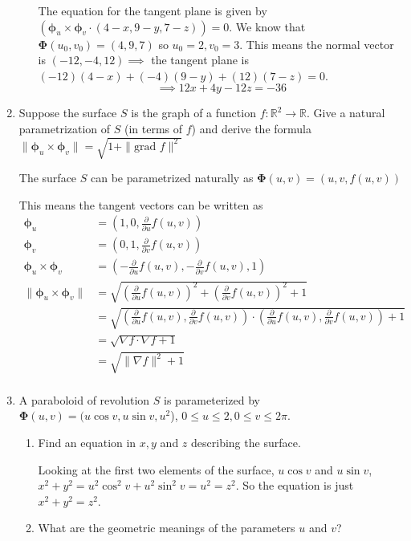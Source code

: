\documentclass{article}
\newcommand{\norm}[1]{\| #1 \|}
\begin{document}
\begin{enumerate}
\begin{enumerate}
        The equation for the tangent plane is given by $(\boldsymbol \phi_u \times \boldsymbol \phi_v \cdot (4-x,9-y,7-z)) = 0$. We know that $\boldsymbol \Phi (u_0, v_0) = (4,9,7)$ so $u_0 = 2, v_0 = 3$. This means the normal vector is $(-12,-4,12) \implies$ the tangent plane is $(-12)(4-x) + (-4)(9-y) + (12)(7-z) = 0$.
        \[ \implies 12x + 4y - 12z = -36 \]
    \end{enumerate}
    \newpage    
    \item Suppose the surface $S$ is the graph of a function $f : \mathbb{R}^2 \rightarrow \mathbb{R}$. Give a natural parametrization of $S$ (in terms of $f$) and derive the formula $\norm{\boldsymbol \phi_u \times \boldsymbol \phi_v} = \sqrt{1 + \norm{\text{grad }f}^2}$

    The surface $S$ can be parametrized naturally as $\boldsymbol \Phi (u,v) = (u, v, f(u,v))$

    This means the tangent vectors can be written as
    \begin{align*}
        \boldsymbol \phi_u &= (1, 0, \frac{\partial}{\partial u} f(u,v)) \\
        \boldsymbol \phi_v &= (0, 1, \frac{\partial}{\partial v} f(u,v)) \\
        \boldsymbol \phi_u \times \boldsymbol \phi_v &= ( - \frac{\partial}{\partial u} f(u,v),  - \frac{\partial}{\partial v} f(u,v), 1) \\
        \norm{\boldsymbol \phi_u \times \boldsymbol \phi_v} &= \sqrt{(\frac{\partial}{\partial u} f(u,v))^2 + (\frac{\partial}{\partial v} f(u,v))^2 + 1} \\
        &= \sqrt{ (\frac{\partial}{\partial u} f(u,v), \frac{\partial}{\partial v} f(u,v)) \cdot (\frac{\partial}{\partial u} f(u,v), \frac{\partial}{\partial v} f(u,v)) + 1} \\
        &= \sqrt{\nabla f \cdot \nabla f + 1} \\
        &= \sqrt{\norm{\nabla f}^2 + 1} \\
    \end{align*}
    \newpage
    \item A paraboloid of revolution $S$ is parameterized by $\boldsymbol \Phi (u,v) = (u \cos v, u \sin v, u^2$), $0 \leq u \leq 2, 0 \leq v \leq 2\pi$.
    \begin{enumerate}
        \item Find an equation in $x,y$ and $z$ describing the surface.

        Looking at the first two elements of the surface, $u \cos v$ and $u \sin v$, $x^2 + y^2 = u^2 \cos^2 v + u^2 \sin ^2 v = u^2 = z^2$. So the equation is just $x^2 + y^2 = z^2$.
        \item What are the geometric meanings of the parameters $u$ and $v$?


\end{enumerate}
\end{enumerate}
\end{document}
